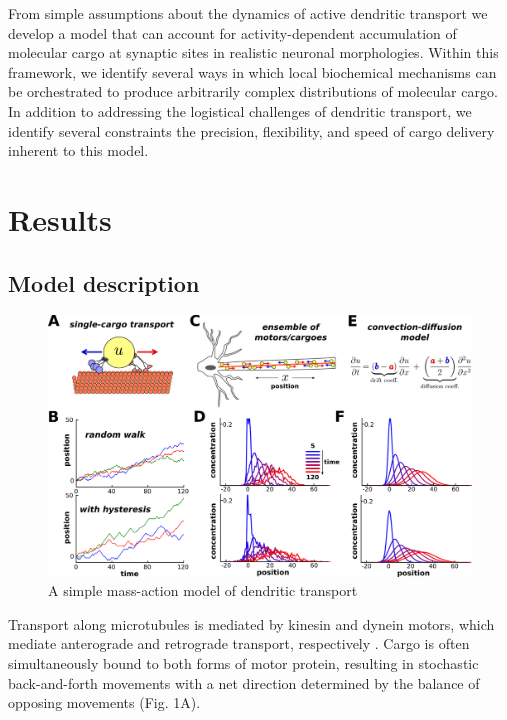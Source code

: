 \documentclass[10pt]{wlpeerj}
\begin{document}
From simple assumptions about the dynamics of active dendritic transport we develop a model that can account for activity-dependent accumulation of molecular cargo at synaptic sites in realistic neuronal morphologies.
Within this framework, we identify several ways in which local biochemical mechanisms can be orchestrated to produce arbitrarily complex distributions of molecular cargo.
In addition to addressing the logistical challenges of dendritic transport, we identify several constraints the precision, flexibility, and speed of cargo delivery inherent to this model.

\section*{Results}

\subsection*{Model description}

\begin{figure}[!b]
\begin{center}
\includegraphics[width=0.9\columnwidth]{00_stochastic.png}
\caption{A simple mass-action model of dendritic transport}
\end{center}
\end{figure}

Transport along microtubules is mediated by kinesin and dynein motors, which mediate anterograde and retrograde transport, respectively \citep{Hirokawa_2010,Gagnon_2011}.
Cargo is often simultaneously bound to both forms of motor protein, resulting in stochastic back-and-forth movements with a net direction determined by the balance of opposing movements \citep{Hancock_2014,Buxbaum_2014b} (Fig. 1A).
\end{document}

